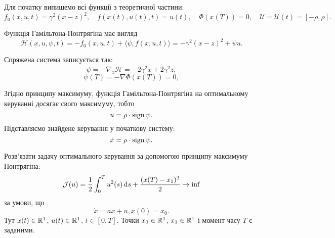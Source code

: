 \begin{solution}
    Для початку випишемо всі функції з теоретичної частини:
    \begin{equation}
        f_0(x, u, t) = \gamma^2 (x - z)^2, \quad f(x(t), u(t), t) = u(t), \quad \Phi(x(T)) = 0, \quad \mathcal{U} = \mathcal{U}(t) = [-\rho, \rho].
    \end{equation}
    
    Функція Гамільтона-Понтрягіна має вигляд
    \begin{equation}
        \mathcal{H} (x, u, \psi, t) = - f_0(x, u, t) + \langle \psi, f(x, u, t) \rangle = - \gamma^2 (x - z)^2 + \psi u.
    \end{equation}
    
    Спряжена система записується так:
    \begin{equation}
        \dot \psi = - \nabla_x \mathcal{H} = - 2 \gamma^2 x + 2 \gamma^2 z,
    \end{equation}
    \begin{equation} 
        \psi(T) = - \nabla \Phi(x(T)) = 0,
    \end{equation}
    
    Згідно принципу максимуму, функція Гамільтона-Понтрягіна на оптимальному керуванні досягає свого максимуму, тобто
    \begin{equation} 
        u = \rho \cdot \operatorname{sign} \psi.
    \end{equation} 
    Підставляємо знайдене керування у початкову систему:
    \begin{equation}
        \dot x = \rho \cdot \operatorname{sign} \psi.
    \end{equation}
\end{solution}

\begin{problem}
    Розв'язати задачу оптимального керування за допомогою принципу максимуму Понтрягіна:
    \begin{equation*}
        \mathcal{J}(u) = \dfrac12 \int_0^T u^2(s) \mathop{}\!\mathrm{d} s + \dfrac{(x(T) - x_1)^2}{2} \to \inf
    \end{equation*}
    за умови, що
    \begin{equation*}
        \dot x = a x + u, x(0) = x_0.
    \end{equation*}
    Тут $x(t) \in \mathbb{R}^1$, $u(t) \in \mathbb{R}^1$, $t \in [0, T]$. Точки $x_0 \in \mathbb{R}^1$, $x_1 \in \mathbb{R}^1$ і момент часу $T$ є заданими.
\end{problem}

